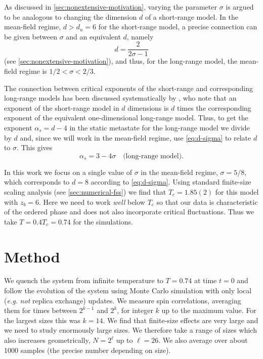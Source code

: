 As discussed in \cref{sec:nonextensive-motivation}, varying the parameter
$\sigma$ is argued to be analogous to changing the dimension $d$ of a
short-range model. In the mean-field regime, $d>d_u=6$ for the short-range
model, a precise connection can be given between $\sigma$ and an equivalent
$d$, namely
\begin{equation}
  d = \frac{2}{2\sigma - 1}
  \label{eq:d-sigma}
\end{equation}
(see \cref{sec:nonextensive-motivation}), and thus, for the long-range model,
the mean-field regime is $1/2 < \sigma < 2/3$.

The connection between critical exponents of the short-range and corresponding
long-range models has been discussed systematically by
\textcite{banos2012correspondence}, who note that an exponent of the
short-range model in $d$ dimensions is $d$ times the corresponding exponent of
the equivalent one-dimensional long-range model.
Thus, to get the exponent $\alpha_s=d-4$ in the static metastate for the
long-range model we divide by $d$ and, since we will work in the mean-field
regime, use \cref{eq:d-sigma} to relate $d$ to $\sigma$. This gives
\begin{equation}
  \alpha_s = 3-4\sigma
  \quad\text{(long-range model).}
  \label{eq:alpha-rsb-lr}
\end{equation}

In this work we focus on a single value of $\sigma$ in the mean-field regime,
$\sigma=5/8$, which corresponds to $d=8$ according to \cref{eq:d-sigma}. Using
standard finite-size scaling analysis (see \cref{sec:numerical-fss}) we find
that $T_c=1.85(2)$ for this model with $z_b=6$.
Here we need to work \emph{well} below $T_c$ so that our data is characteristic
of the ordered phase and does not also incorporate critical fluctuations.
Thus we take $T = 0.4 T_c = 0.74$ for the simulations.


\section{Method}

We quench the system from infinite temperature to $T=0.74$ at time $t=0$ and
follow the evolution of the system using Monte Carlo simulation with only local
(\textit{e.g.} \emph{not} replica exchange) updates. We measure spin
correlations, averaging them for times between $2^{k-1}$ and $2^k$, for integer
$k$ up to the maximum value. For the largest sizes this was $k=14$. We find
that finite-size effects are very large and we need to study enormously large
sizes. We therefore take a range of sizes which also increases geometrically,
$N=2^{\ell}$ up to $\ell=26$. We also average over about 1000 samples (the
precise number depending on size).


